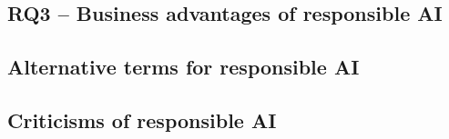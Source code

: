 \subsection{RQ3 -- Business advantages of responsible AI}



\subsection{Alternative terms for responsible AI}
\label{sec:results-alernative-terms}

\subsection{Criticisms of responsible AI}
\label{sec:results-criticism}
